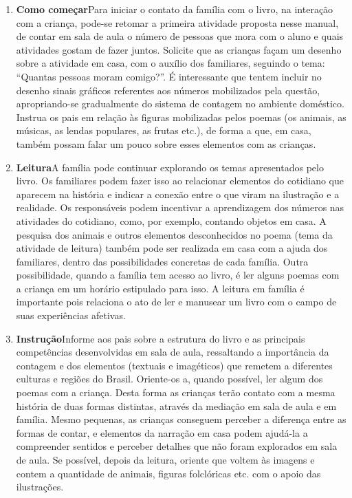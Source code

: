 \documentclass[11pt]{extarticle}
\begin{document}
\begin{enumerate}
\item \textbf{Como começar}\quad Para iniciar o contato da família com o livro, na interação com a criança, pode-se retomar a primeira atividade proposta nesse manual, de contar em sala de aula o número de pessoas que mora com o aluno e quais atividades gostam de fazer juntos. Solicite que as crianças façam um desenho sobre a atividade em casa, com o auxílio dos familiares, seguindo o tema: ``Quantas pessoas moram comigo?''. É interessante que tentem incluir no desenho sinais gráficos referentes aos números mobilizados pela questão, apropriando-se gradualmente do sistema de contagem no ambiente doméstico. Instrua os pais em relação às figuras mobilizadas pelos poemas (os animais, as músicas, as lendas populares, as frutas etc.), de forma a que, em casa, também possam falar um pouco sobre esses elementos com as crianças.

\item \textbf{Leitura}\quad A família pode continuar 
explorando os temas apresentados pelo livro. Os familiares podem fazer isso ao relacionar 
elementos do cotidiano que aparecem na história e indicar a conexão 
entre o que viram na ilustração e a realidade. Os responsáveis podem incentivar a aprendizagem dos números nas atividades do cotidiano, como, por exemplo, contando objetos em casa. A pesquisa dos animais e outros elementos desconhecidos no poema (tema da atividade de leitura) também pode ser realizada em casa com a ajuda dos familiares, dentro das possibilidades concretas de cada família. Outra possibilidade, quando a família tem acesso ao livro, é ler alguns poemas com a criança em um horário estipulado para isso. A leitura em família é importante pois relaciona o ato de ler e manusear um livro com o campo de suas experiências afetivas.

\item \textbf{Instrução}\quad Informe aos pais sobre a estrutura do livro e as principais competências desenvolvidas em sala de aula, ressaltando a importância da contagem e dos elementos (textuais e imagéticos) que remetem a diferentes culturas e regiões do Brasil.
Oriente-os a, quando possível, ler algum dos poemas com a criança.
Desta forma as crianças terão contato com a mesma história de duas formas distintas, através da mediação em sala de aula e em família. 
Mesmo pequenas, as crianças conseguem perceber a diferença entre 
as formas de contar, e elementos da narração em casa podem ajudá-la a compreender 
sentidos e perceber detalhes que não foram explorados em sala de aula. Se possível, depois da leitura, oriente 
que voltem às imagens e contem a quantidade de animais, figuras folclóricas etc. com o apoio das  ilustrações. 


\end{enumerate}
\end{document}
